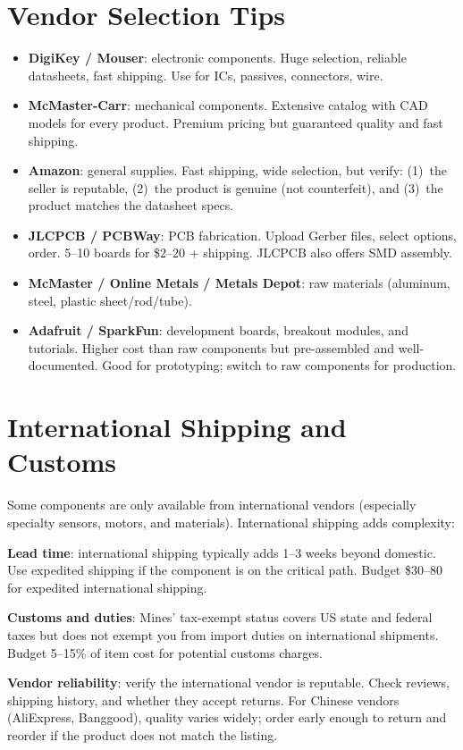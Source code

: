 \section{Vendor Selection Tips}
\begin{itemize}[nosep,leftmargin=1.5em]
\item \textbf{DigiKey / Mouser}: electronic components. Huge selection, reliable datasheets, fast shipping. Use for ICs, passives, connectors, wire.
\item \textbf{McMaster-Carr}: mechanical components. Extensive catalog with CAD models for every product. Premium pricing but guaranteed quality and fast shipping.
\item \textbf{Amazon}: general supplies. Fast shipping, wide selection, but verify: (1)~the seller is reputable, (2)~the product is genuine (not counterfeit), and (3)~the product matches the datasheet specs.
\item \textbf{JLCPCB / PCBWay}: PCB fabrication. Upload Gerber files, select options, order. 5--10 boards for \$2--20 + shipping. JLCPCB also offers SMD assembly.
\item \textbf{McMaster / Online Metals / Metals Depot}: raw materials (aluminum, steel, plastic sheet/rod/tube).
\item \textbf{Adafruit / SparkFun}: development boards, breakout modules, and tutorials. Higher cost than raw components but pre-assembled and well-documented. Good for prototyping; switch to raw components for production.
\end{itemize}



\section{International Shipping and Customs}
Some components are only available from international vendors (especially specialty sensors, motors, and materials). International shipping adds complexity:

\textbf{Lead time}: international shipping typically adds 1--3 weeks beyond domestic. Use expedited shipping if the component is on the critical path. Budget \$30--80 for expedited international shipping.

\textbf{Customs and duties}: Mines' tax-exempt status covers US state and federal taxes but does not exempt you from import duties on international shipments. Budget 5--15\% of item cost for potential customs charges.

\textbf{Vendor reliability}: verify the international vendor is reputable. Check reviews, shipping history, and whether they accept returns. For Chinese vendors (AliExpress, Banggood), quality varies widely; order early enough to return and reorder if the product does not match the listing.

